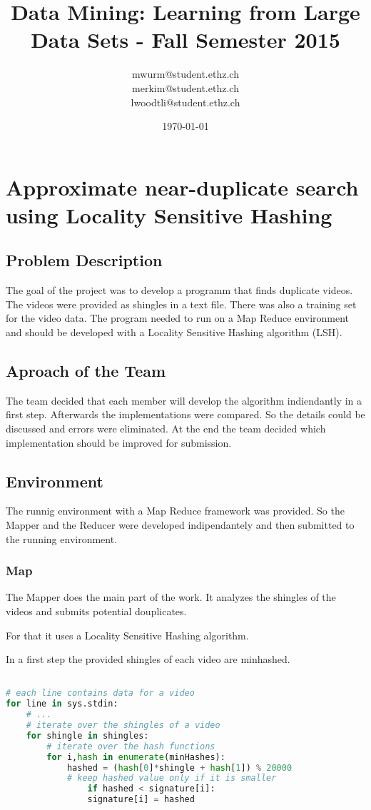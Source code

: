 \documentclass[a4paper, 11pt]{article}
\title{Data Mining: Learning from Large Data Sets - Fall Semester 2015}
\author{mwurm@student.ethz.ch\\ merkim@student.ethz.ch\\ lwoodtli@student.ethz.ch\\}
\date{\today}
\begin{document}
\maketitle

\section*{Approximate near-duplicate search using Locality Sensitive Hashing} 

\subsection{Problem Description}

The goal of the project was to develop a programm that finds duplicate videos.
The videos were provided as shingles in a text file. There was also a training
set for the video data.
The program needed to run on a Map Reduce environment and should be developed
with a Locality Sensitive Hashing algorithm (LSH).


\subsection{Aproach of the Team}
The team decided that each member will develop the algorithm indiendantly in a first step.
Afterwards the implementations were compared. So the details could be
discussed and errors were eliminated.
At the end the team decided which implementation should be improved for
submission.

\subsection{Environment}
The runnig environment with a Map Reduce framework was provided. So the
Mapper and the Reducer were developed indipendantely and then submitted to
the running environment.

\subsubsection{Map}

The Mapper does the main part of the work. It analyzes the shingles of the
videos and submits potential douplicates.

For that it uses a Locality Sensitive Hashing algorithm.

In a first step the provided shingles of each video are minhashed.

\begin{lstlisting}[language=Python]

# each line contains data for a video
for line in sys.stdin:
	# ...
	# iterate over the shingles of a video
	for shingle in shingles:
		# iterate over the hash functions
		for i,hash in enumerate(minHashes):
			hashed = (hash[0]*shingle + hash[1]) % 20000
			# keep hashed value only if it is smaller 
				if hashed < signature[i]:
				signature[i] = hashed
\end{lstlisting}
\end{document}
